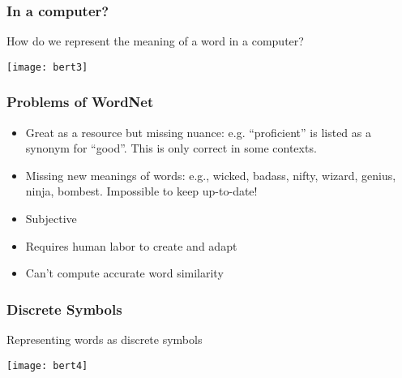 \begin{frame}[fragile]\frametitle{In a computer?}

How do we represent the meaning of a word in a computer?

\begin{center}
\texttt{[image: bert3]}
\end{center}		  


\end{frame}

\begin{frame}[fragile]\frametitle{Problems of WordNet}


\begin{itemize}
\item Great as a resource but missing nuance: e.g. ``proficient'' is listed as a synonym for ``good''.  This is only correct in some contexts.
\item Missing new meanings of words: e.g., wicked, badass, nifty, wizard, genius, ninja, bombest. Impossible to keep up-to-date!
\item Subjective
\item Requires human labor to create and adapt
\item Can't compute accurate word similarity 
\end{itemize}


\end{frame}

\begin{frame}[fragile]\frametitle{Discrete Symbols}

Representing words as discrete symbols

\begin{center}
\texttt{[image: bert4]}
\end{center}		  



\end{frame}

